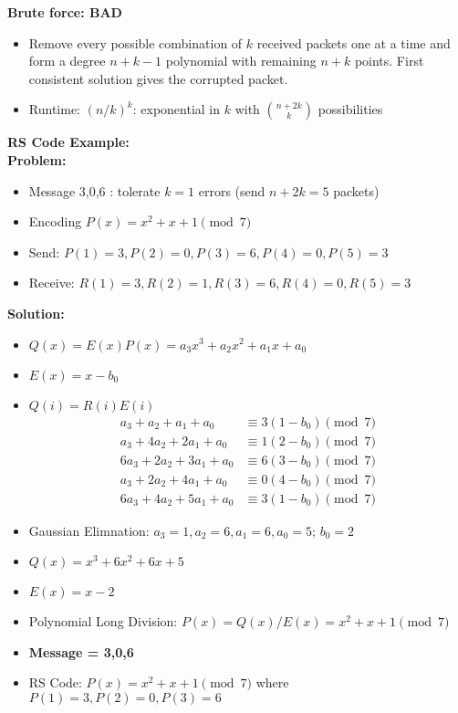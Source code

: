 \documentclass{article}\usepackage{amsmath,amssymb,amsthm,tikz,tkz-graph,color,chngpage,soul,hyperref,csquotes,graphicx,floatrow,polynom}\newcommand*{\QEDB}{\hfill\ensuremath{\square}}\newtheorem*{prop}{Proposition}\renewcommand{\theenumi}{\alph{enumi}}\usepackage[shortlabels]{enumitem}\usepackage[nobreak=true]{mdframed}\usetikzlibrary{matrix,calc}\MakeOuterQuote{"}\usepackage[margin=0.75in]{geometry} \newtheorem{theorem}{Theorem}
\begin{document}
\begin{mdframed}

\textbf{Brute force: BAD}
\begin{itemize}
\item Remove every possible combination of $k$ received packets one at a time and form a degree $n+k-1$ polynomial with remaining $n+k$ points. First consistent solution gives the corrupted packet.
\item Runtime: $(n/k)^k$: exponential in $k$ with $\binom{n+2k}{k}$ possibilities
\end{itemize}
\end{mdframed}

\begin{mdframed}
\textbf{RS Code Example:}\\
\textbf{Problem:}
\begin{itemize}
\item Message 3,0,6 : tolerate $k = 1$ errors (send $n+2k = 5$ packets)
\item Encoding $P(x) = x^2 + x + 1 \pmod{7}$
\item Send: $P(1) = 3, P(2) = 0, P(3) = 6, P(4) = 0, P(5) = 3$
\item Receive: $R(1) = 3, R(2) = 1, R(3) = 6, R(4) = 0, R(5) = 3$
\end{itemize}
\textbf{Solution:}
\begin{itemize}
\item $Q(x) = E(x)P(x) = a_3x^3+a_2x^2+a_1x+a_0$
\item $E(x) = x-b_0$
\item $Q(i) = R(i)E(i)$
\begin{align*}
a_3+a_2+a_1+a_0 & \equiv 3(1-b_0) \pmod{7} \\
a_3+4a_2+2a_1+a_0 & \equiv 1(2-b_0) \pmod{7} \\
6a_3+2a_2+3a_1+a_0 & \equiv 6(3-b_0) \pmod{7} \\
a_3+2a_2+4a_1+a_0 & \equiv 0(4-b_0) \pmod{7} \\
6a_3+4a_2+5a_1+a_0 & \equiv 3(1-b_0) \pmod{7} 
\end{align*}
\item Gaussian Elimnation: $a_3=1, a_2=6, a_1=6, a_0=5$; $b_0=2$
\item $Q(x) = x^3+6x^2+6x+5$
\item $E(x)=x-2$
\item Polynomial Long Division: $P(x) = Q(x)/E(x) = x^2+x+1 \pmod{7}$\\
\item\textbf{Message = 3,0,6}
\item RS Code: $P(x) = x^2 + x + 1 \pmod{7}$ where $P(1) = 3, P(2) = 0, P(3) = 6$
\end{itemize}
\end{mdframed}
\end{document}
